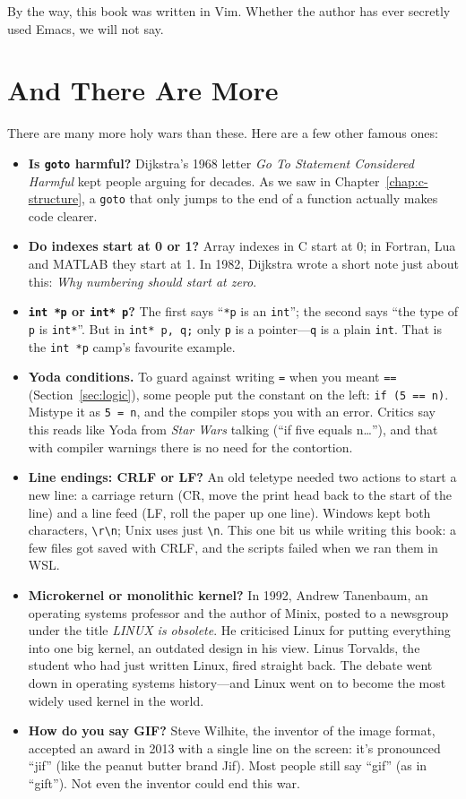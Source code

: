 By the way, this book was written in Vim. Whether the author has ever secretly used Emacs, we will not say.

\section{And There Are More}

There are many more holy wars than these. Here are a few other famous ones:

\begin{itemize}
  \item \textbf{Is \texttt{goto} harmful?} Dijkstra's 1968 letter \emph{Go To Statement Considered Harmful} kept people arguing for decades. As we saw in Chapter~\ref{chap:c-structure}, a \texttt{goto} that only jumps to the end of a function actually makes code clearer.
  \item \textbf{Do indexes start at 0 or 1?} Array indexes in C start at 0; in Fortran, Lua and MATLAB they start at 1. In 1982, Dijkstra wrote a short note just about this: \emph{Why numbering should start at zero}.
  \item \textbf{\texttt{int *p} or \texttt{int* p}?} The first says ``\texttt{*p} is an \texttt{int}''; the second says ``the type of \texttt{p} is \texttt{int*}''. But in \texttt{int* p, q;} only \texttt{p} is a pointer---\texttt{q} is a plain \texttt{int}. That is the \texttt{int *p} camp's favourite example.
  \item \textbf{Yoda conditions.} To guard against writing \texttt{=} when you meant \texttt{==} (Section~\ref{sec:logic}), some people put the constant on the left: \texttt{if (5 == n)}. Mistype it as \texttt{5 = n}, and the compiler stops you with an error. Critics say this reads like Yoda from \emph{Star Wars} talking (``if five equals n\ldots''), and that with compiler warnings there is no need for the contortion.
  \item \textbf{Line endings: CRLF or LF?} An old teletype needed two actions to start a new line: a carriage return (CR, move the print head back to the start of the line) and a line feed (LF, roll the paper up one line). Windows kept both characters, \texttt{\textbackslash r\textbackslash n}; Unix uses just \texttt{\textbackslash n}. This one bit us while writing this book: a few files got saved with CRLF, and the scripts failed when we ran them in WSL.
  \item \textbf{Microkernel or monolithic kernel?} In 1992, Andrew Tanenbaum, an operating systems professor and the author of Minix, posted to a newsgroup under the title \emph{LINUX is obsolete}. He criticised Linux for putting everything into one big kernel, an outdated design in his view. Linus Torvalds, the student who had just written Linux, fired straight back. The debate went down in operating systems history---and Linux went on to become the most widely used kernel in the world.
  \item \textbf{How do you say GIF?} Steve Wilhite, the inventor of the image format, accepted an award in 2013 with a single line on the screen: it's pronounced ``jif'' (like the peanut butter brand Jif). Most people still say ``gif'' (as in ``gift''). Not even the inventor could end this war.
\end{itemize}

